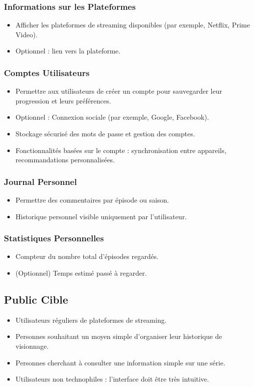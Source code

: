 \subsubsection{Informations sur les Plateformes}
\begin{itemize}
    \item Afficher les plateformes de streaming disponibles (par exemple, Netflix, Prime Video).
    \item Optionnel : lien vers la plateforme.
\end{itemize}

\subsubsection{Comptes Utilisateurs}
\begin{itemize}
    \item Permettre aux utilisateurs de créer un compte pour sauvegarder leur progression et leurs préférences.
    \item Optionnel : Connexion sociale (par exemple, Google, Facebook).
    \item Stockage sécurisé des mots de passe et gestion des comptes.
    \item Fonctionnalités basées sur le compte : synchronisation entre appareils, recommandations personnalisées.
\end{itemize}

\subsubsection{Journal Personnel}
\begin{itemize}
    \item Permettre des commentaires par épisode ou saison.
    \item Historique personnel visible uniquement par l'utilisateur.
\end{itemize}

\subsubsection{Statistiques Personnelles}
\begin{itemize}
    \item Compteur du nombre total d'épisodes regardés.
    \item (Optionnel) Temps estimé passé à regarder.
\end{itemize}

\subsection{Public Cible}
\begin{itemize}
    \item Utilisateurs réguliers de plateformes de streaming.
    \item Personnes souhaitant un moyen simple d'organiser leur historique de visionnage.
    \item Personnes cherchant à consulter une information simple sur une série.
    \item Utilisateurs non technophiles : l'interface doit être très intuitive.
\end{itemize}

